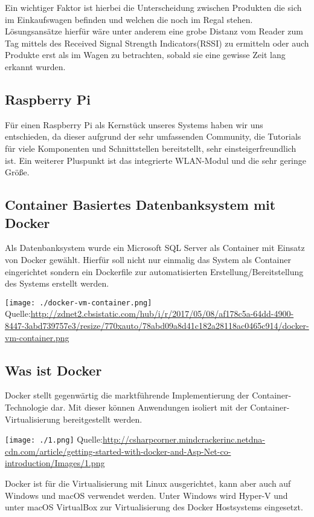 \documentclass{sigchi}
\begin{document}
Ein wichtiger Faktor ist hierbei die Unterscheidung zwischen Produkten die sich im Einkaufswagen befinden und welchen die noch im Regal stehen. Lösungsansätze hierfür wäre unter anderem eine grobe Distanz vom Reader zum Tag mittels des Received Signal Strength Indicators(RSSI) zu ermitteln oder auch Produkte erst als im Wagen zu betrachten, sobald sie eine gewisse Zeit lang erkannt wurden.


\subsection{Raspberry Pi}
Für einen Raspberry Pi als Kernstück unseres Systems haben wir uns entschieden, da dieser aufgrund der sehr umfassenden Community, die Tutorials für viele Komponenten und Schnittstellen bereitstellt, sehr einsteigerfreundlich ist. Ein weiterer Pluspunkt ist das integrierte WLAN-Modul und die sehr geringe Größe.

\subsection{Container Basiertes Datenbanksystem mit Docker}
Als Datenbanksystem wurde ein Microsoft SQL Server als Container mit Einsatz von Docker gewählt. Hierfür soll nicht nur einmalig das System als Container eingerichtet sondern ein Dockerfile zur automatisierten Erstellung/Bereitstellung des Systems erstellt werden.

\texttt{[image: ./docker-vm-container.png]}
Quelle:\url{http://zdnet2.cbsistatic.com/hub/i/r/2017/05/08/af178c5a-64dd-4900-8447-3abd739757e3/resize/770xauto/78abd09a8d41c182a28118ac0465c914/docker-vm-container.png}

\subsection{Was ist Docker}
Docker stellt gegenwärtig die marktführende Implementierung der Container-Technologie dar. Mit dieser können Anwendungen isoliert mit der Container-Virtualisierung bereitgestellt werden.

\texttt{[image: ./1.png]}
Quelle:\url{http://csharpcorner.mindcrackerinc.netdna-cdn.com/article/getting-started-with-docker-and-Asp-Net-co-introduction/Images/1.png}

Docker ist für die Virtualisierung mit Linux ausgerichtet, kann aber auch auf Windows und macOS verwendet werden. Unter Windows wird Hyper-V und unter macOS VirtualBox zur Virtualisierung des Docker Hostsystems eingesetzt.
\end{document}
